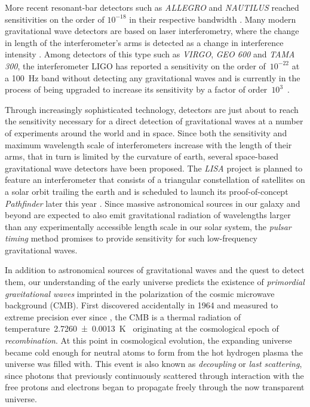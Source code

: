 More recent resonant-bar detectors such as \emph{ALLEGRO} and \emph{NAUTILUS} \autocite{Astone1997,Pizzella1999} reached sensitivities on the order of \(10^{-18}\) in their respective bandwidth \autocite{Ju2000}. Many modern gravitational wave detectors are based on laser interferometry, where the change in length of the interferometer's arms is detected as a change in interference intensity \autocite{Ju2000}. Among detectors of this type such as \emph{VIRGO}, \emph{GEO 600} and \emph{TAMA 300}, the interferometer LIGO has reported a sensitivity on the order of~\(10^{-22}\) at a \SI{100}{\hertz} band without detecting any gravitational waves and is currently in the process of being upgraded to increase its sensitivity by a factor of order~\(10^3\)~\autocite{LIGO2009,LIGO2015}.

Through increasingly sophisticated technology, detectors are just about to reach the sensitivity necessary for a direct detection of gravitational waves at a number of experiments around the world and in space. Since both the sensitivity and maximum wavelength scale of interferometers increase with the length of their arms, that in turn is limited by the curvature of earth, several space-based gravitational wave detectors have been proposed. The \emph{LISA} project is planned to feature an interferometer that consists of a triangular constellation of satellites on a solar orbit trailing the earth and is scheduled to launch its proof-of-concept \emph{Pathfinder} later this year \autocite{LISA2014}. Since massive astronomical sources in our galaxy and beyond are expected to also emit gravitational radiation of wavelengths larger than any experimentally accessible length scale in our solar system, the \emph{pulsar timing} method \autocite[and references therein]{IPTA2009} promises to provide sensitivity for such low-frequency gravitational waves.

In addition to astronomical sources of gravitational waves and the quest to detect them, our understanding of the early universe predicts the existence of \emph{primordial gravitational waves} imprinted in the polarization of the cosmic microwave background (CMB). First discovered accidentally in 1964 \autocite{Penzias1965} and measured to extreme precision ever since \autocite{Planck2015}, the CMB is a thermal radiation of temperature~\SI{2.7260+-0.0013}{\kelvin}~\autocite{Fixsen2009} originating at the cosmological epoch of \emph{recombination}. At this point in cosmological evolution, the expanding universe became cold enough for neutral atoms to form from the hot hydrogen plasma the universe was filled with. This event is also known as \emph{decoupling} or \emph{last scattering}, since photons that previously continuously scattered through interaction with the free protons and electrons began to propagate freely through the now transparent universe.

